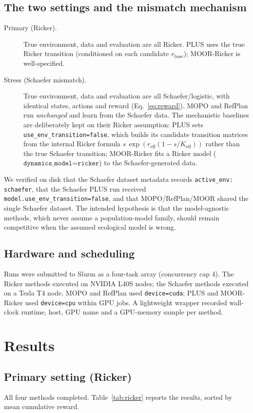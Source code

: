 \documentclass[11pt]{article}
\newcommand{\reff}{r_{\mathrm{eff}}}
\newcommand{\Keff}{K_{\mathrm{eff}}}
\newcommand{\rbase}{r_{\mathrm{base}}}
\begin{document}
\subsection{The two settings and the mismatch mechanism}
\begin{description}
  \item[Primary (Ricker).] True environment, data and evaluation are all Ricker.
  PLUS uses the true Ricker transition (conditioned on each candidate $\rbase$);
  MOOR-Ricker is well-specified.
  \item[Stress (Schaefer mismatch).] True environment, data and evaluation are
  all Schaefer/logistic, with identical states, actions and reward
  (Eq.~\ref{eq:reward}). MOPO and RefPlan run \emph{unchanged} and learn from the
  Schaefer data. The mechanistic baselines are deliberately kept on their Ricker
  assumption: PLUS sets \verb|use_env_transition=false|, which builds its
  candidate transition matrices from the internal Ricker formula
  $s\,\exp(\reff(1-s/\Keff))$ rather than the true Schaefer transition;
  MOOR-Ricker fits a Ricker model ($\texttt{dynamics\_model=ricker}$) to the
  Schaefer-generated data.
\end{description}
We verified on disk that the Schaefer dataset metadata records
\texttt{active\_env: schaefer}, that the Schaefer PLUS run received
\texttt{model.use\_env\_transition=false}, and that MOPO/RefPlan/MOOR shared the
single Schaefer dataset. The intended hypothesis is that the model-agnostic
methods, which never assume a population-model family, should remain competitive
when the assumed ecological model is wrong.

\subsection{Hardware and scheduling}
Runs were submitted to Slurm as a four-task array (concurrency cap 4). The Ricker
methods executed on NVIDIA L40S nodes; the Schaefer methods executed on a Tesla
T4 node. MOPO and RefPlan used \texttt{device=cuda}; PLUS and MOOR-Ricker used
\texttt{device=cpu} within GPU jobs. A lightweight wrapper recorded wall-clock
runtime, host, GPU name and a GPU-memory sample per method.

\section{Results}

\subsection{Primary setting (Ricker)}
All four methods completed. Table~\ref{tab:ricker} reports the results, sorted by
mean cumulative reward.
\end{document}

